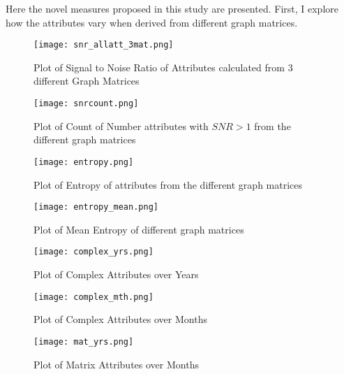 Here the novel measures proposed in this study are presented. First, I explore how the attributes vary when derived from different graph matrices.\\

\begin{figure}[!htp]
    \centering
    \texttt{[image: snr\_allatt\_3mat.png]}
    \caption{Plot of Signal to Noise Ratio of Attributes calculated from 3 different Graph Matrices}
    \label{fig:snr}
\end{figure}

\begin{figure}[!htp]
    \centering
    \texttt{[image: snrcount.png]}
    \caption{Plot of Count of Number attributes with $SNR > 1$ from the different graph matrices}
    \label{fig:snr count}
\end{figure}

\begin{figure}[!htp]
    \centering
    \texttt{[image: entropy.png]}
    \caption{Plot of Entropy of attributes from the different graph matrices}
    \label{fig:entropy}
\end{figure}

\begin{figure}[!htp]
    \centering
    \texttt{[image: entropy\_mean.png]}
    \caption{Plot of Mean Entropy of different graph matrices}
    \label{fig:mean entropy}
\end{figure}


\begin{figure}[H]
    \centering
    \texttt{[image: complex\_yrs.png]}
    \caption{Plot of Complex Attributes over Years}
    \label{fig:complex yrs}
\end{figure}

\begin{figure}[H]
    \centering
    \texttt{[image: complex\_mth.png]}
    \caption{Plot of Complex Attributes over Months}
    \label{fig:compolex mth}
\end{figure}


\begin{figure}[H]
    \centering
    \texttt{[image: mat\_yrs.png]}
    \caption{Plot of Matrix Attributes over Months}
    \label{fig:mat yrs}
\end{figure}

